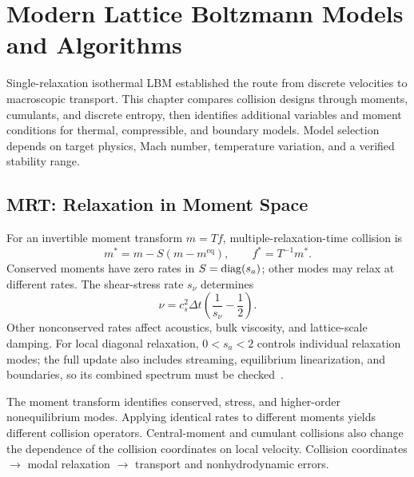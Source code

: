 \chapter{Modern Lattice Boltzmann Models and Algorithms}\label{ch:16}
\begin{chaptersummary}
Single-relaxation isothermal LBM established the route from discrete velocities to macroscopic transport. This chapter compares collision designs through moments, cumulants, and discrete entropy, then identifies additional variables and moment conditions for thermal, compressible, and boundary models. Model selection depends on target physics, Mach number, temperature variation, and a verified stability range.
\end{chaptersummary}

\section{MRT: Relaxation in Moment Space}
For an invertible moment transform $m=Tf$, multiple-relaxation-time collision is
\[
m^*=m-S(m-m^{\mathrm{eq}}),\qquad
f^*=T^{-1}m^*.
\]
Conserved moments have zero rates in $S=\operatorname{diag}(s_a)$; other modes may relax at different rates.
The shear-stress rate $s_\nu$ determines
\[
\nu=c_s^2\Delta t\left(\frac1{s_\nu}-\frac12\right).
\]
Other nonconserved rates affect acoustics, bulk viscosity, and lattice-scale damping.
For local diagonal relaxation, $0<s_a<2$ controls individual relaxation modes;
the full update also includes streaming, equilibrium linearization, and boundaries, so its combined spectrum must be checked~\cite{dhumieres2002}.

{The moment transform identifies conserved, stress, and higher-order nonequilibrium modes.
Applying identical rates to different moments yields different collision operators.
Central-moment and cumulant collisions also change the dependence of the collision coordinates on local velocity.}
{Collision coordinates $\longrightarrow$ modal relaxation $\longrightarrow$ transport and nonhydrodynamic errors.}

